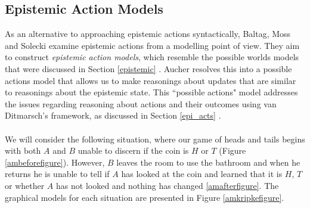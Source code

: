 \documentclass[12pt, a4paper, titlepage]{scrartcl}
\begin{document}
\subsection{Epistemic Action Models} \label{act_mods}
As an alternative to approaching epistemic actions syntactically, Baltag, Moss
and Solecki examine epistemic actions from a modelling point of view.
They aim to construct {\em epistemic action models}, which resemble the possible 
worlds models that were discussed in Section \ref{epistemic}
\cite{baltag1998lpa}.
Aucher resolves this into a possible actions model that allows us to make
reasonings about updates that are similar to reasonings about the epistemic
state.
This ``possible actions" model addresses the issues regarding reasoning about
actions and their outcomes using van Ditmarsch's framework, as discussed in
Section \ref{epi_acts} \cite{hoek2008dynamic}.\\
\\
We will consider the following situation, where our game of heads and tails
begins with both $A$ and $B$ unable to discern if the coin is $H$ or $T$ (Figure
\ref{ambeforefigure}).
However, $B$ leaves the room to use the bathroom and when he returns he is unable
to tell if $A$ has looked at the coin and learned that it is $H$, $T$ or whether
$A$ has not looked and nothing has changed \ref{amafterfigure}.
The graphical models for each situation are presented in Figure
\ref{amkripkefigure}.\\
\end{document}

